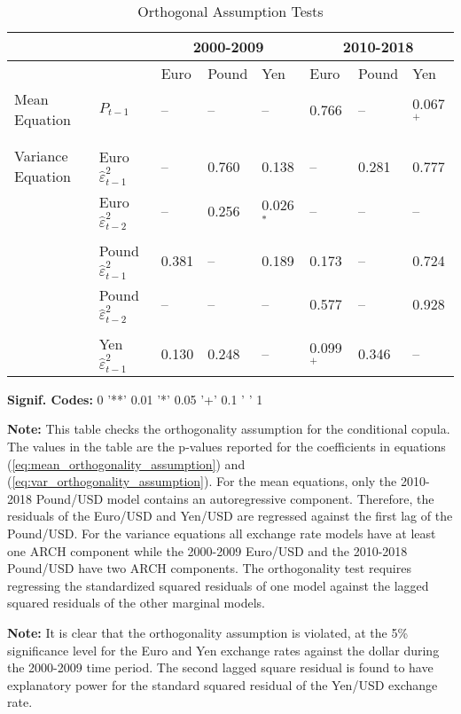 \documentclass[12pt]{article}
\begin{document}
\begin{table}
	\fontsize{10pt}{10pt}\selectfont
	\centering
	\caption{Orthogonal Assumption Tests}
	\begin{tabular}{l l | l l l | l l l}
		\midrule
				& & \multicolumn{3}{c}{2000-2009} & \multicolumn{3}{c}{2010-2018} \\
		\midrule
				& & Euro & Pound & Yen & Euro & Pound & Yen \\
		\hline
        Mean Equation     & $P_{t-1}$                            & --    & --    & --          &  0.766       & --      & 0.067$^{+}$  \\ \\ \\
		Variance Equation & Euro $\hat{\varepsilon}^{2}_{t-1}$   & --    & 0.760 & 0.138       &  --          & 0.281   & 0.777        \\
                          & Euro $\hat{\varepsilon}^{2}_{t-2}$   & --    & 0.256 & 0.026$^{*}$ &  --          & --      & --           \\ \\
		                  & Pound $\hat{\varepsilon}^{2}_{t-1}$  & 0.381 & --    & 0.189       &  0.173       & --      & 0.724        \\
		                  & Pound $\hat{\varepsilon}^{2}_{t-2}$  & --    & --    & --          &  0.577       & --      & 0.928        \\ \\
                          & Yen $\hat{\varepsilon}^{2}_{t-1}$    & 0.130 & 0.248 & --          &  0.099$^{+}$ & 0.346   & --           \\
	\hline
	\end{tabular}
	\begin{tablenotes}
		\item{\footnotesize \textbf{Signif. Codes:} 0 '**' 0.01 '*' 0.05 '+' 0.1 ' ' 1}
		\item{\footnotesize \textbf{Note:} This table checks the orthogonality assumption for the conditional copula. The values in the table are the p-values reported for the coefficients in equations (\ref{eq:mean_orthogonality_assumption}) and (\ref{eq:var_orthogonality_assumption}). For the mean equations, only the 2010-2018 Pound/USD model contains an autoregressive component. Therefore, the residuals of the Euro/USD and Yen/USD are regressed against the first lag of the Pound/USD. For the variance equations all exchange rate models have at least one ARCH component while the 2000-2009 Euro/USD and the 2010-2018 Pound/USD have two ARCH components. The orthogonality test requires regressing the standardized squared residuals of one model against the lagged squared residuals of the other marginal models.}
		\item{\footnotesize \textbf{Note:} It is clear that the orthogonality assumption is violated, at the 5\% significance level for the Euro and Yen exchange rates against the dollar during the 2000-2009 time period. The second lagged square residual is found to have explanatory power for the standard squared residual of the Yen/USD exchange rate.}
	\end{tablenotes}
	\label{tbl:Conditioning_Variable_Checks}
\end{table}
\end{document}
